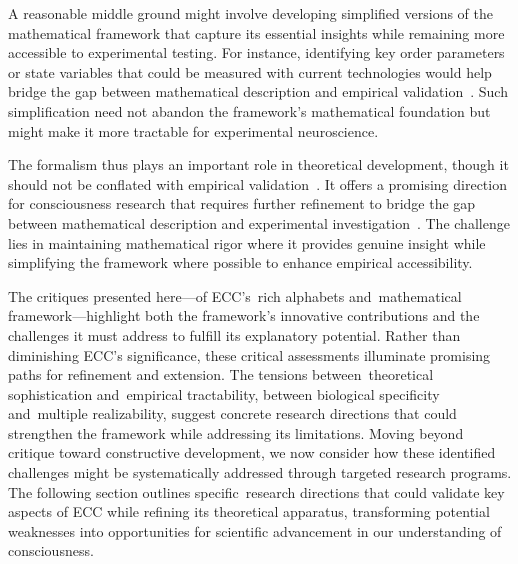 A reasonable middle ground might involve developing simplified versions of the mathematical framework that capture its essential insights while remaining more accessible to experimental testing. For instance, identifying key order parameters or state variables that could be measured with current technologies would help bridge the gap between mathematical description and empirical validation~\cite{seth2021being, haken2013principles}. Such simplification need not abandon the framework's mathematical foundation but might make it more tractable for experimental neuroscience.

The formalism thus plays an important role in theoretical development, though it should not be conflated with empirical validation~\cite{goff2019galileo, churchland2013touching}. It offers a promising direction for consciousness research that requires further refinement to bridge the gap between mathematical description and experimental investigation~\cite{feinberg2016ancient, thompson2010mind}. The challenge lies in maintaining mathematical rigor where it provides genuine insight while simplifying the framework where possible to enhance empirical accessibility.

The critiques presented here—of ECC's~rich alphabets and~mathematical framework—highlight both the framework's innovative contributions and the challenges it must address to fulfill its explanatory potential. Rather than diminishing ECC's significance, these critical assessments illuminate promising paths for refinement and extension. The tensions between~theoretical sophistication and~empirical tractability, between biological specificity and~multiple realizability, suggest concrete research directions that could strengthen the framework while addressing its limitations. Moving beyond critique toward constructive development, we now consider how these identified challenges might be systematically addressed through targeted research programs. The following section outlines specific~research directions that could validate key aspects of ECC while refining its theoretical apparatus, transforming potential weaknesses into opportunities for scientific advancement in our understanding of consciousness.
